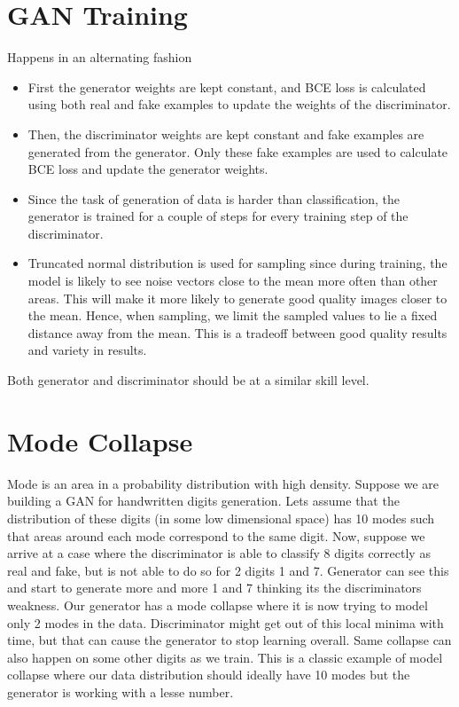 \documentclass[../gan.tex]{subfiles}
\begin{document}
\section{GAN Training}
Happens in an alternating fashion
\begin{itemize}
    \item First the generator weights are kept constant, and BCE loss is calculated using both real and fake examples to update the weights of the discriminator.
    \item Then, the discriminator weights are kept constant and fake examples are generated from the generator. Only these fake examples are used to calculate BCE loss and update the generator weights.
    \item Since the task of generation of data is harder than classification, the generator is trained for a couple of steps for every training step of the discriminator.
    \item Truncated normal distribution is used for sampling since during training, the model is likely to see noise vectors close to the mean more often than other areas. This will make it more likely to generate good quality images closer to the mean. Hence, when sampling, we limit the sampled values to lie a fixed distance away from the mean. This is a tradeoff between good quality results and variety in results.
\end{itemize}
Both generator and discriminator should be at a similar skill level.

\section{Mode Collapse}
Mode is an area in a probability distribution with high density.
Suppose we are building a GAN for handwritten digits generation. Lets assume that the distribution of these digits (in some low dimensional space) has 10 modes such that areas around each mode correspond to the same digit. Now, suppose we arrive at a case where the discriminator is able to classify 8 digits correctly as real and fake, but is not able to do so for 2 digits 1 and 7. Generator can see this and start to generate more and more 1 and 7 thinking its the discriminators weakness. Our generator has a mode collapse where it is now trying to model only 2 modes in the data.
Discriminator might get out of this local minima with time, but that can cause the generator to stop learning overall. Same collapse can also happen on some other digits as we train. This is a classic example of model collapse where our data distribution should ideally have 10 modes but the generator is working with a lesse number.
\end{document}
